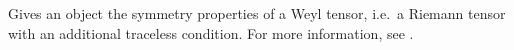
Gives an object the symmetry properties of a Weyl tensor, i.e.~a
Riemann tensor with an additional traceless condition. For more
information, see .


